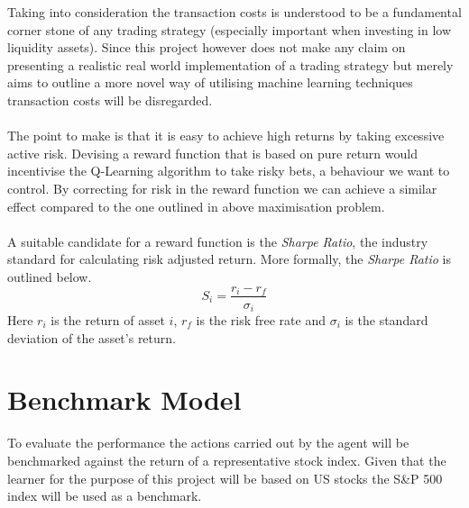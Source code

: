 \documentclass[dvips,12pt]{article}
\begin{document}
Taking into consideration the transaction costs is understood to be a fundamental corner stone of any trading strategy (especially important when investing in low liquidity assets). Since this project however does not make any claim on presenting a realistic real world implementation of a trading strategy but merely aims to outline a more novel way of utilising machine learning techniques transaction costs will be disregarded.
\\\\
The point to make is that it is easy to achieve high returns by taking excessive active risk. Devising a reward function that is based on pure return would incentivise the Q-Learning algorithm to take risky bets, a behaviour we want to control. 
By correcting for risk in the reward function we can achieve a similar effect compared to the one outlined in above maximisation problem.
\\\\
A suitable candidate for a reward function is the \emph{Sharpe Ratio}, the industry standard for calculating risk adjusted return. More formally, the \emph{Sharpe Ratio} is outlined below.
\begin{equation}
	S_i = \frac{r_i - r_f}{\sigma_i}
\end{equation}
Here $r_i$ is the return of asset $i$, $r_f$ is the risk free rate and $\sigma_i$ is the standard deviation of the asset's return.

\section{Benchmark Model}
To evaluate the performance the actions carried out by the agent will be benchmarked against the return of a representative stock index. Given that the learner for the purpose of this project will be based on US stocks the S\&P 500 index will be used as a benchmark.
\end{document}
